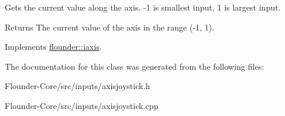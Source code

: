 Gets the current value along the axis. -\/1 is smallest input, 1 is largest input. 

\begin{DoxyReturn}{Returns}
The current value of the axis in the range (-\/1, 1). 
\end{DoxyReturn}


Implements \hyperlink{classflounder_1_1iaxis_a990ecb5ffa5ec07b3d5e2e4016b2e4a0}{flounder\+::iaxis}.



The documentation for this class was generated from the following files\+:\begin{DoxyCompactItemize}
\item 
Flounder-\/\+Core/src/inputs/axisjoystick.\+h\item 
Flounder-\/\+Core/src/inputs/axisjoystick.\+cpp\end{DoxyCompactItemize}
